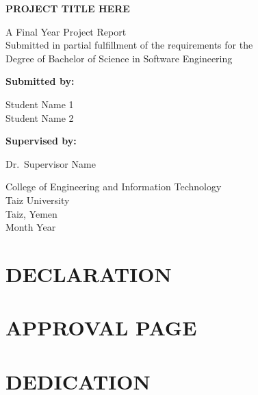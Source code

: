 \documentclass[12pt,a4paper]{report}
\begin{document}

\begin{titlepage}
\centering
\vspace*{1cm}
{\fontsize{22}{26}\selectfont\bfseries PROJECT TITLE HERE\par}
\vspace{1.5cm}
{\large A Final Year Project Report\\
Submitted in partial fulfillment of the requirements for the\\
Degree of Bachelor of Science in Software Engineering\par}
\vspace{2cm}
{\fontsize{14}{18}\selectfont\bfseries Submitted by:\par}
\vspace{0.5cm}
{\fontsize{14}{18}\selectfont
Student Name 1\\
Student Name 2\par}
\vspace{1.5cm}
{\fontsize{14}{18}\selectfont\bfseries Supervised by:} {\fontsize{14}{18}\selectfont Dr.\ Supervisor Name\par}
\vspace{2cm}
{\fontsize{14}{18}\selectfont
College of Engineering and Information Technology\\
Taiz University\\
Taiz, Yemen\\
Month Year\par}
\end{titlepage}

\chapter*{DECLARATION}

\chapter*{APPROVAL PAGE}

\chapter*{DEDICATION}
\end{document}
